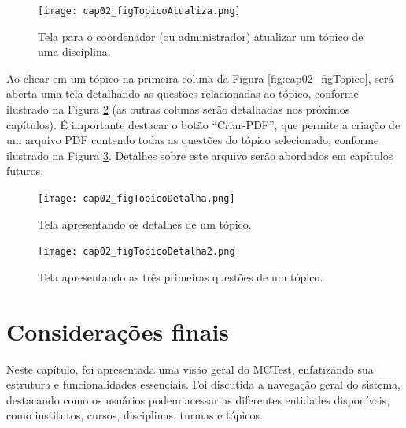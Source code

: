 \begin{figure}[!ht]
  \centering
  \texttt{[image: cap02\_figTopicoAtualiza.png]}
  \caption{Tela para o coordenador (ou administrador) atualizar um tópico de uma disciplina.}
  \label{fig:cap02_figTopicoAtualiza}
\end{figure}

Ao clicar em um tópico na primeira coluna da Figura \ref{fig:cap02_figTopico}, será aberta uma tela detalhando as questões relacionadas ao tópico, conforme ilustrado na Figura \ref{fig:cap02_figTopicoDetalha} (as outras colunas serão detalhadas nos próximos capítulos). É importante destacar o botão ``Criar-PDF'', que permite a criação de um arquivo PDF contendo todas as questões do tópico selecionado, conforme ilustrado na Figura \ref{fig:cap02_figTopicoDetalha2}. Detalhes sobre este arquivo serão abordados em capítulos futuros.

\begin{figure}[!ht]
  \centering
  \texttt{[image: cap02\_figTopicoDetalha.png]}
  \caption{Tela apresentando os detalhes de um tópico.}
  \label{fig:cap02_figTopicoDetalha}
\end{figure}

\begin{figure}[!ht]
  \centering
  \texttt{[image: cap02\_figTopicoDetalha2.png]}
  \caption{Tela apresentando as três primeiras questões de um tópico.}
  \label{fig:cap02_figTopicoDetalha2}
\end{figure}








\section{Considerações finais}

Neste capítulo, foi apresentada uma visão geral do MCTest, enfatizando sua estrutura e funcionalidades essenciais. Foi discutida a navegação geral do sistema, destacando como os usuários podem acessar as diferentes entidades disponíveis, como institutos, cursos, disciplinas, turmas e tópicos.

